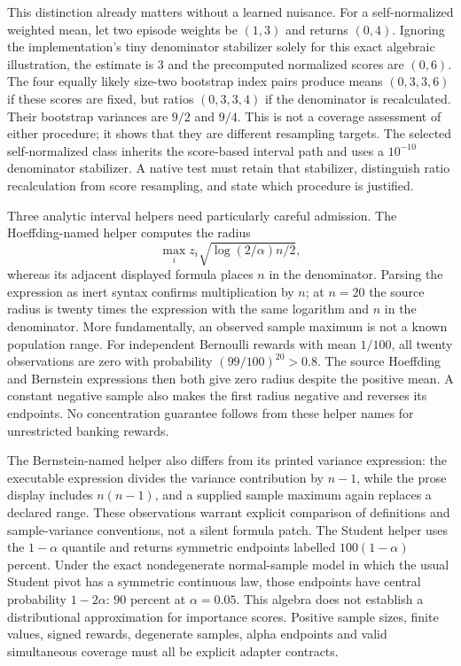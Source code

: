 This distinction already matters without a learned nuisance. For a
self-normalized weighted mean, let two episode weights be $(1,3)$ and returns
$(0,4)$. Ignoring the implementation's tiny denominator stabilizer solely for
this exact algebraic illustration, the estimate is $3$ and the precomputed
normalized scores are $(0,6)$. The four equally likely size-two bootstrap index
pairs produce means $(0,3,3,6)$ if these scores are fixed, but ratios
$(0,3,3,4)$ if the denominator is recalculated. Their bootstrap variances are
$9/2$ and $9/4$. This is not a coverage assessment of either procedure; it shows
that they are different resampling targets. The selected self-normalized class
inherits the score-based interval path and uses a $10^{-10}$ denominator
stabilizer. A native test must retain that stabilizer, distinguish ratio
recalculation from score resampling, and state which procedure is justified.
\citep{exec23_scope_rl_sources,exec23_scope_rl_reference}

Three analytic interval helpers need particularly careful admission. The
Hoeffding-named helper computes the radius
\[
 \max_i z_i\sqrt{\log(2/\alpha)n/2},
\]
whereas its adjacent displayed formula places $n$ in the denominator. Parsing
the expression as inert syntax confirms multiplication by $n$; at $n=20$ the
source radius is twenty times the expression with the same logarithm and $n$
in the denominator. More fundamentally, an observed sample maximum is not a
known population range. For independent Bernoulli rewards with mean $1/100$,
all twenty observations are zero with probability $(99/100)^{20}>0.8$. The
source Hoeffding and Bernstein expressions then both give zero radius despite
the positive mean. A constant negative sample also makes the first radius
negative and reverses its endpoints. No concentration guarantee follows from
these helper names for unrestricted banking rewards.
\citep{exec23_scope_rl_sources,exec23_scope_rl_reference}

The Bernstein-named helper also differs from its printed variance expression:
the executable expression divides the variance contribution by $n-1$, while
the prose display includes $n(n-1)$, and a supplied sample maximum again replaces
a declared range. These observations warrant explicit comparison of definitions
and sample-variance conventions, not a silent formula patch. The Student helper
uses the $1-\alpha$ quantile and returns symmetric endpoints labelled
$100(1-\alpha)$ percent. Under the exact nondegenerate normal-sample model in
which the usual Student pivot has a symmetric continuous law, those endpoints
have central probability $1-2\alpha$: $90$ percent at $\alpha=0.05$. This
algebra does not establish a distributional approximation for importance
scores. Positive sample sizes, finite values, signed rewards, degenerate
samples, alpha endpoints and valid simultaneous coverage must all be explicit
adapter contracts. \citep{exec23_scope_rl_sources,exec23_scope_rl_reference}

